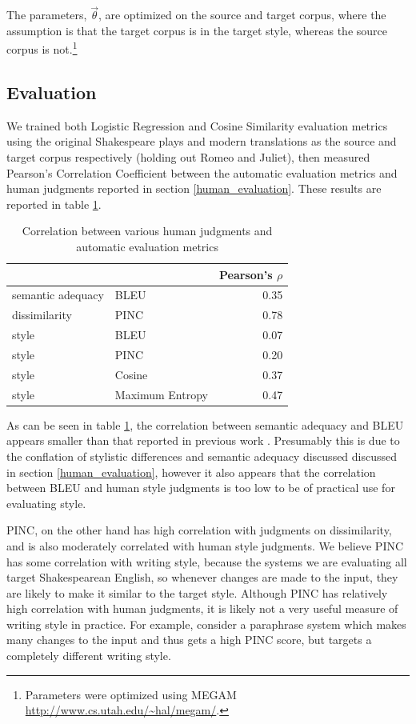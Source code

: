 \documentclass[10pt,a5paper,twoside]{article}
\begin{document}
The parameters, $\vec{\theta}$, are optimized on the source and target corpus, where the assumption is that the target corpus
is in the target style, whereas the source corpus is not.\footnote{
  Parameters were optimized using MEGAM \url{http://www.cs.utah.edu/~hal/megam/}.
}

\subsection{Evaluation}
We trained both Logistic Regression and Cosine Similarity evaluation metrics using the original Shakespeare plays and modern translations as
the source and target corpus respectively (holding out Romeo and Juliet), then measured Pearson's Correlation Coefficient between the automatic
evaluation metrics and human judgments reported in section \ref{human_evaluation}.  These results are reported in table \ref{correlation}.

\begin{table}
  \begin{center}
  \begin{tabular}{|l|l|r|}
    \hline
    & & Pearson's $\rho$ \\
    \hline
    \hline
    semantic adequacy & BLEU & 0.35 \\
    \hline
    dissimilarity & PINC & 0.78 \\
    \hline
    style & BLEU & 0.07 \\
    \hline
    style & PINC & 0.20 \\
    \hline
    style & Cosine & 0.37 \\
    \hline
    style & Maximum Entropy & 0.47 \\
    \hline
  \end{tabular}
  \end{center}
  \caption{Correlation between various human judgments and automatic evaluation metrics}
  \label{correlation}
\end{table}

As can be seen in table \ref{correlation}, the correlation between semantic adequacy and BLEU appears smaller than that reported in previous work \cite{chen11}.  Presumably this is
due to the conflation of stylistic differences and semantic adequacy discussed discussed in section \ref{human_evaluation}, however it also appears 
that the correlation between BLEU and human style judgments is too low to be of practical use for evaluating style.

PINC, on the other hand has high correlation with judgments on dissimilarity, and is also moderately correlated with human style
judgments.  We believe PINC has some correlation with writing style, because the systems we are evaluating all target Shakespearean English, 
so whenever changes are made to the input, they are likely to make it similar to the target style.
Although PINC has relatively high correlation with human judgments, it is likely not a very useful measure of writing style in practice.
For example, consider a paraphrase system which makes many changes to the input and thus gets a high PINC score, but targets a completely different writing style.
\end{document}
